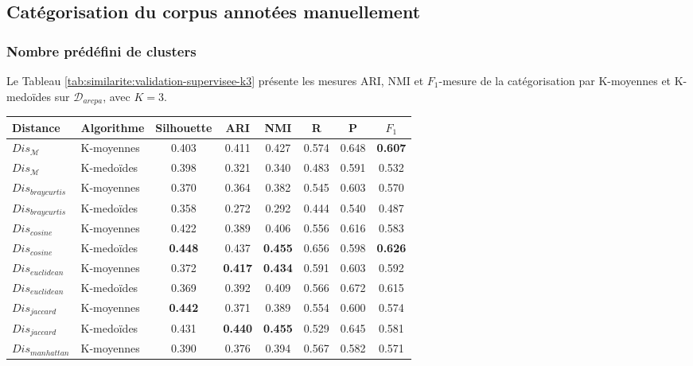 \subsection{Catégorisation du corpus annotées manuellement}
\subsubsection{Nombre prédéfini de clusters}
 Le Tableau \ref{tab:similarite:validation-supervisee-k3} présente les mesures ARI, NMI et $F_1$-mesure de la catégorisation par K-moyennes et K-medoïdes sur $\mathcal{D}_{arcpa}$, avec $K=3$. 

\begin{table}[!htb]
	\centering \scriptsize
	\begin{tabular}[pos]{|l|l|c|c|c|c|c|c|}
		\hline
		\textbf{Distance}& \textbf{Algorithme}& \textbf{Silhouette}& \textbf{ARI} & \textbf{NMI} & \textbf{R} & \textbf{P} & \textbf{$F_1$} \\ \hline
		 $Dis_\mathcal{M}$          & K-moyennes    & 0.403      & 0.411 & 0.427 & 0.574  & 0.648     & \textbf{0.607} \\ \hline
		 $Dis_\mathcal{M}$          & K-medoïdes  & 0.398      & 0.321 & 0.340 & 0.483  & 0.591     & 0.532 \\ \hline
		 $Dis_{braycurtis}$ & K-moyennes    & 0.370      & 0.364 & 0.382 & 0.545  & 0.603     & 0.570 \\ \hline
		 $Dis_{braycurtis}$ & K-medoïdes  & 0.358      & 0.272 & 0.292 & 0.444  & 0.540     & 0.487 \\ \hline
		 $Dis_{cosine}$     & K-moyennes    & 0.422     & 0.389 & 0.406 & 0.556  & 0.616     & 0.583 \\ \hline
		 $Dis_{cosine}$     & K-medoïdes  & \textbf{0.448}      & 0.437 & \textbf{0.455} & 0.656  & 0.598     & \textbf{0.626} \\ \hline
		 $Dis_{euclidean}$  & K-moyennes    & 0.372      & \textbf{0.417} & \textbf{0.434} & 0.591  & 0.603     & 0.592 \\ \hline
		 $Dis_{euclidean}$  & K-medoïdes  & 0.369      & 0.392 & 0.409 & 0.566  & 0.672     & 0.615 \\ \hline
		 $Dis_{jaccard}$    & K-moyennes    & \textbf{0.442}      & 0.371 & 0.389 & 0.554  & 0.600     & 0.574 \\ \hline
		 $Dis_{jaccard}$    & K-medoïdes  & 0.431      & \textbf{0.440} & \textbf{0.455} & 0.529  & 0.645     & 0.581 \\ \hline
		 $Dis_{manhattan}$  & K-moyennes    & 0.390      & 0.376 & 0.394 & 0.567  & 0.582     & 0.571 \\ \hline

\end{tabular}
\end{table}
